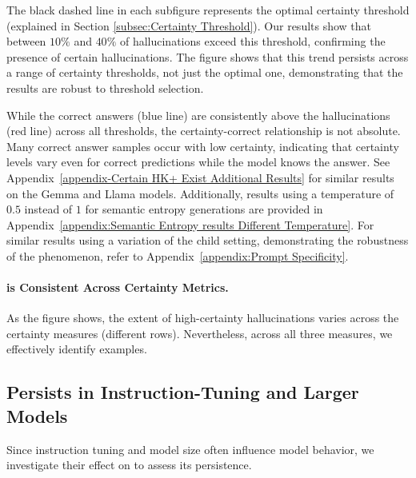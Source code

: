 The black dashed line in each subfigure represents the optimal certainty threshold (explained in Section \ref{subsec:Certainty Threshold}). Our results show that between $10\%$ and $40\%$ of hallucinations exceed this threshold, confirming the presence of certain hallucinations. The figure shows that this trend persists across a range of certainty thresholds, not just the optimal one, demonstrating that the results are robust to threshold selection.

While the correct answers (blue line) are consistently above the hallucinations (red line) across all thresholds, the certainty-correct relationship is not absolute. Many correct answer samples occur with low certainty, indicating that certainty levels vary even for correct predictions while the model knows the answer.
See Appendix~\ref{appendix-Certain HK+ Exist Additional Results} for similar results on the Gemma and Llama models. Additionally, results using a temperature of $0.5$ instead of $1$ for semantic entropy generations are provided in Appendix~\ref{appendix:Semantic Entropy results Different Temperature}. For similar results using a variation of the child setting, demonstrating the robustness of the phenomenon, refer to Appendix~\ref{appendix:Prompt Specificity}.



\paragraph{\chk is Consistent Across Certainty Metrics.}


As the figure shows, the extent of high-certainty hallucinations varies across the certainty measures (different rows).
Nevertheless, across all three measures, we effectively identify \chk examples.



\subsection{\chk Persists in Instruction-Tuning and Larger Models} \label{chk Persists in Instruction-Tuning and Larger Models}

Since instruction tuning and model size often influence model behavior, we investigate their effect on \chk to assess its persistence.

